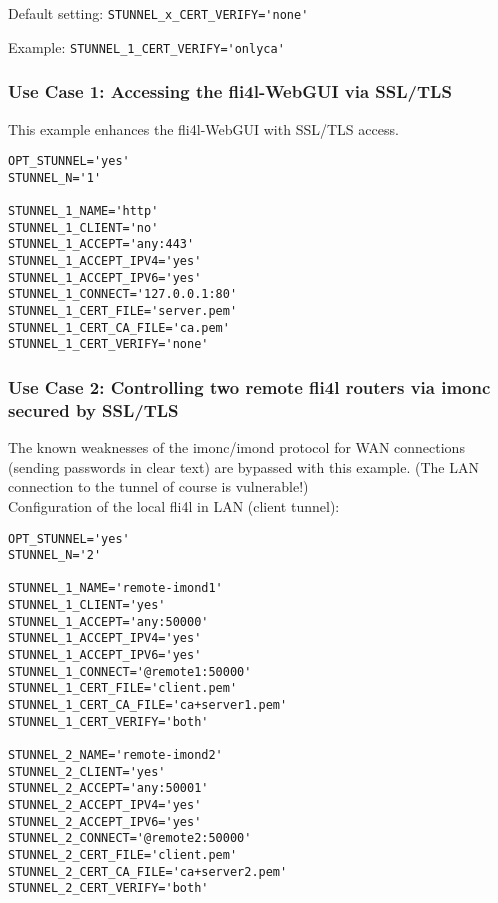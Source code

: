 \begin{description}
\begin{itemize}
\end{itemize}

Default setting: \verb+STUNNEL_x_CERT_VERIFY='none'+

Example: \verb+STUNNEL_1_CERT_VERIFY='onlyca'+

\end{description}

\subsubsection{Use Case 1: Accessing the fli4l-WebGUI via SSL/TLS}

This example enhances the fli4l-WebGUI with SSL/TLS access.

\begin{example}
\begin{verbatim}
OPT_STUNNEL='yes'
STUNNEL_N='1'

STUNNEL_1_NAME='http'
STUNNEL_1_CLIENT='no'
STUNNEL_1_ACCEPT='any:443'
STUNNEL_1_ACCEPT_IPV4='yes'
STUNNEL_1_ACCEPT_IPV6='yes'
STUNNEL_1_CONNECT='127.0.0.1:80'
STUNNEL_1_CERT_FILE='server.pem'
STUNNEL_1_CERT_CA_FILE='ca.pem'
STUNNEL_1_CERT_VERIFY='none'
\end{verbatim}
\end{example}

\subsubsection{Use Case 2: Controlling two remote
fli4l routers via imonc secured by SSL/TLS}

The known weaknesses of the imonc/imond protocol for WAN connections (sending
passwords in clear text) are bypassed with this example. (The LAN connection to
the tunnel of course is vulnerable!)\\

Configuration of the local fli4l in LAN (client tunnel):
\begin{example}
\begin{verbatim}
OPT_STUNNEL='yes'
STUNNEL_N='2'

STUNNEL_1_NAME='remote-imond1'
STUNNEL_1_CLIENT='yes'
STUNNEL_1_ACCEPT='any:50000'
STUNNEL_1_ACCEPT_IPV4='yes'
STUNNEL_1_ACCEPT_IPV6='yes'
STUNNEL_1_CONNECT='@remote1:50000'
STUNNEL_1_CERT_FILE='client.pem'
STUNNEL_1_CERT_CA_FILE='ca+server1.pem'
STUNNEL_1_CERT_VERIFY='both'

STUNNEL_2_NAME='remote-imond2'
STUNNEL_2_CLIENT='yes'
STUNNEL_2_ACCEPT='any:50001'
STUNNEL_2_ACCEPT_IPV4='yes'
STUNNEL_2_ACCEPT_IPV6='yes'
STUNNEL_2_CONNECT='@remote2:50000'
STUNNEL_2_CERT_FILE='client.pem'
STUNNEL_2_CERT_CA_FILE='ca+server2.pem'
STUNNEL_2_CERT_VERIFY='both'
\end{verbatim}
\end{example}

